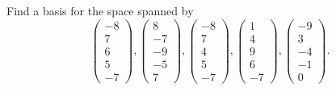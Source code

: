 \documentclass[a4paper,11pt]{article}
\begin{document}
 Find a basis for the space spanned by
\[
  \left(
    \begin{array}{r}
      -8\\7\\6\\5\\-7
    \end{array}
  \right),
  \left(
    \begin{array}{r}
      8\\-7\\-9\\-5\\7
    \end{array}
  \right),
  \left(
    \begin{array}{r}
      -8\\7\\4\\5\\-7
    \end{array}
  \right),
  \left(
    \begin{array}{r}
      1\\4\\9\\6\\-7
    \end{array}
  \right),
  \left(
    \begin{array}{r}
      -9\\3\\-4\\-1\\0
    \end{array}
  \right).
\] \\
\end{document}
